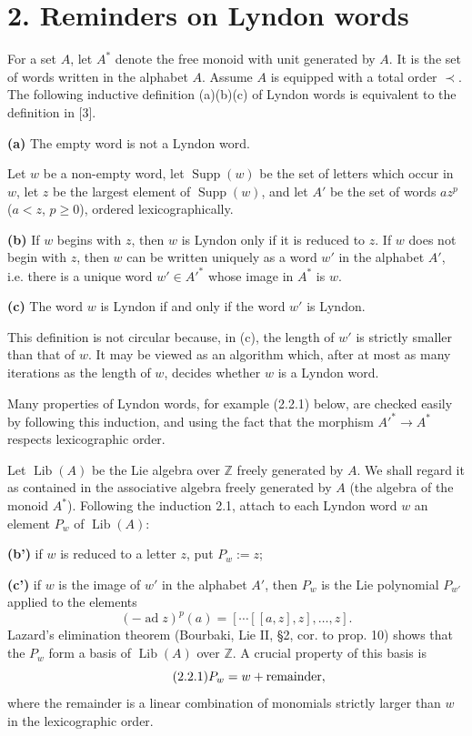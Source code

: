 \documentclass[10pt,a4paper]{article}
\newcommand{\Z}{\mathbb Z}
\newcommand{\ad}{\operatorname{ad}}
\newcommand{\supp}{\operatorname{Supp}}
\theoremstyle{deligne}
\newcommand{\heading}[1]{\vspace{0.65em}\noindent{\bfseries #1}\quad}
\begin{document}
\section*{2. Reminders on Lyndon words}

\heading{2.1.} For a set \(A\), let \(A^*\) denote the free monoid with unit generated by \(A\). It is the set of words written in the alphabet \(A\). Assume \(A\) is equipped with a total order \(\prec\). The following inductive definition (a)(b)(c) of Lyndon words is equivalent to the definition in [3].

\textbf{(a)} The empty word is not a Lyndon word.

Let \(w\) be a non-empty word, let \(\supp(w)\) be the set of letters which occur in \(w\), let \(z\) be the largest element of \(\supp(w)\), and let \(A'\) be the set of words \(az^p\) (\(a<z\), \(p\ge0\)), ordered lexicographically.

\textbf{(b)} If \(w\) begins with \(z\), then \(w\) is Lyndon only if it is reduced to \(z\). If \(w\) does not begin with \(z\), then \(w\) can be written uniquely as a word \(w'\) in the alphabet \(A'\), i.e. there is a unique word \(w'\in A'^*\) whose image in \(A^*\) is \(w\).

\textbf{(c)} The word \(w\) is Lyndon if and only if the word \(w'\) is Lyndon.

This definition is not circular because, in (c), the length of \(w'\) is strictly smaller than that of \(w\). It may be viewed as an algorithm which, after at most as many iterations as the length of \(w\), decides whether \(w\) is a Lyndon word.

Many properties of Lyndon words, for example (2.2.1) below, are checked easily by following this induction, and using the fact that the morphism \(A'^*\to A^*\) respects lexicographic order.

\heading{2.2.} Let \(\operatorname{Lib}(A)\) be the Lie algebra over \(\Z\) freely generated by \(A\). We shall regard it as contained in the associative algebra freely generated by \(A\) (the algebra of the monoid \(A^*\)). Following the induction 2.1, attach to each Lyndon word \(w\) an element \(P_w\) of \(\operatorname{Lib}(A)\):

\textbf{(b')} if \(w\) is reduced to a letter \(z\), put \(P_w:=z\);

\textbf{(c')} if \(w\) is the image of \(w'\) in the alphabet \(A'\), then \(P_w\) is the Lie polynomial \(P_{w'}\) applied to the elements
\[
(-\ad z)^p(a)=[\cdots[[a,z],z],\ldots,z].
\]
Lazard's elimination theorem (Bourbaki, Lie II, \S2, cor. to prop. 10) shows that the \(P_w\) form a basis of \(\operatorname{Lib}(A)\) over \(\Z\). A crucial property of this basis is
\[
\tag{2.2.1}
P_w=w+\hbox{remainder},
\]
where the remainder is a linear combination of monomials strictly larger than \(w\) in the lexicographic order.
\end{document}
